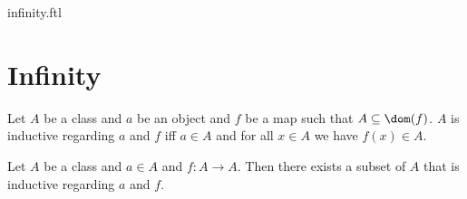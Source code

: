 \documentclass{naproche-library}
\begin{document}
\begin{smodule}{infinity.ftl}

  \section{Infinity}

  \begin{definition}[forthel,id=FOUNDATIONS_10_298374925738210]
    Let $A$ be a class and $a$ be an object and $f$ be a map such that $A \subseteq \dom(f)$.
    $A$ is inductive regarding $a$ and $f$ iff $a \in A$ and for all $x \in A$ we have $f(x) \in A$.
  \end{definition}
  
  \begin{axiom}[forthel,title=Infinity Axiom,id=FOUNDATIONS_10_367388832825344]
    Let $A$ be a class and $a \in A$ and $f : A \to A$.
    Then there exists a subset of $A$ that is inductive regarding $a$ and $f$.
  \end{axiom}
\end{smodule}
\end{document}
